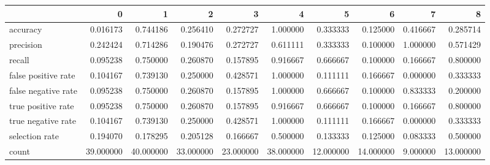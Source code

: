 \begin{tabular}{lrrrrrrrrr}
\toprule
{} &          0 &          1 &          2 &          3 &          4 &          5 &          6 &         7 &          8 \\
\midrule
accuracy            &   0.016173 &   0.744186 &   0.256410 &   0.272727 &   1.000000 &   0.333333 &   0.125000 &  0.416667 &   0.285714 \\
precision           &   0.242424 &   0.714286 &   0.190476 &   0.272727 &   0.611111 &   0.333333 &   0.100000 &  1.000000 &   0.571429 \\
recall              &   0.095238 &   0.750000 &   0.260870 &   0.157895 &   0.916667 &   0.666667 &   0.100000 &  0.166667 &   0.800000 \\
false positive rate &   0.104167 &   0.739130 &   0.250000 &   0.428571 &   1.000000 &   0.111111 &   0.166667 &  0.000000 &   0.333333 \\
false negative rate &   0.095238 &   0.750000 &   0.260870 &   0.157895 &   1.000000 &   0.666667 &   0.100000 &  0.833333 &   0.200000 \\
true positive rate  &   0.095238 &   0.750000 &   0.260870 &   0.157895 &   0.916667 &   0.666667 &   0.100000 &  0.166667 &   0.800000 \\
true negative rate  &   0.104167 &   0.739130 &   0.250000 &   0.428571 &   1.000000 &   0.111111 &   0.166667 &  0.000000 &   0.333333 \\
selection rate      &   0.194070 &   0.178295 &   0.205128 &   0.166667 &   0.500000 &   0.133333 &   0.125000 &  0.083333 &   0.500000 \\
count               &  39.000000 &  40.000000 &  33.000000 &  23.000000 &  38.000000 &  12.000000 &  14.000000 &  9.000000 &  13.000000 \\
\bottomrule
\end{tabular}

